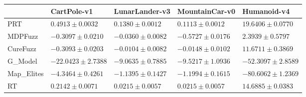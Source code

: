 \begin{tabular}{lllll}
    \toprule
     & CartPole-v1 & LunarLander-v3 & MountainCar-v0 & Humanoid-v4 \\
    \midrule
    PRT & $0.4913 \pm 0.0032$ & $0.1380 \pm 0.0012$ & $0.1113 \pm 0.0012$ & $19.6406 \pm 0.0770$ \\
    MDPFuzz & $-0.3097 \pm 0.0210$ & $-0.0360 \pm 0.0082$ & $-0.5727 \pm 0.0176$ & $2.3939 \pm 0.5797$ \\
    CureFuzz & $-0.3093 \pm 0.0203$ & $-0.0104 \pm 0.0082$ & $-0.0148 \pm 0.0102$ & $11.6711 \pm 0.3869$ \\
    G_Model & $-22.0423 \pm 2.7388$ & $-9.0635 \pm 0.7885$ & $-9.5217 \pm 1.0936$ & $-52.3097 \pm 2.8589$ \\
    Map_Elites & $-4.3464 \pm 0.4261$ & $-1.1395 \pm 0.1427$ & $-1.1994 \pm 0.1615$ & $-80.6062 \pm 1.2369$ \\
    RT & $0.2142 \pm 0.0071$ & $0.0215 \pm 0.0057$ & $0.0215 \pm 0.0057$ & $14.6885 \pm 0.0383$ \\
    \bottomrule
\end{tabular}
    